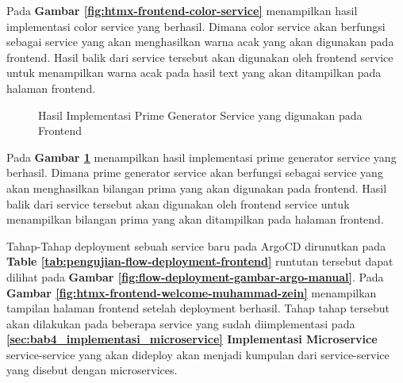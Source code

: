 Pada \textbf{Gambar \ref{fig:htmx-frontend-color-service}} menampilkan hasil
implementasi color service yang berhasil. Dimana color service akan berfungsi
sebagai service yang akan menghasilkan warna acak yang akan digunakan pada
frontend. Hasil balik dari service tersebut akan digunakan oleh frontend
service untuk menampilkan warna acak pada hasil text yang akan ditampilkan pada
halaman frontend.

\begin{figure}[H]
  \centering
  \caption{Hasil Implementasi Prime Generator Service yang digunakan pada Frontend}
  \label{fig:htmx-frontend-prime-generator-service}
\end{figure}

Pada \textbf{Gambar \ref{fig:htmx-frontend-prime-generator-service}}
menampilkan hasil implementasi prime generator service yang berhasil. Dimana
prime generator service akan berfungsi sebagai service yang akan menghasilkan
bilangan prima yang akan digunakan pada frontend. Hasil balik dari service
tersebut akan digunakan oleh frontend service untuk menampilkan bilangan prima
yang akan ditampilkan pada halaman frontend.

Tahap-Tahap deployment sebuah service baru pada ArgoCD dirunutkan pada
\textbf{Table \ref{tab:pengujian-flow-deployment-frontend}} runtutan tersebut
dapat dilihat pada \textbf{Gambar
  \ref{fig:flow-deployment-gambar-argo-manual}}. Pada \textbf{Gambar
  \ref{fig:htmx-frontend-welcome-muhammad-zein}} menampilkan tampilan halaman
frontend setelah deployment berhasil. Tahap tahap tersebut akan dilakukan pada
beberapa service yang sudah diimplementasi pada
\textbf{\ref{sec:bab4_implementasi_microservice} Implementasi Microservice}
service-service yang akan dideploy akan menjadi kumpulan dari service-service
yang disebut dengan microservices.

